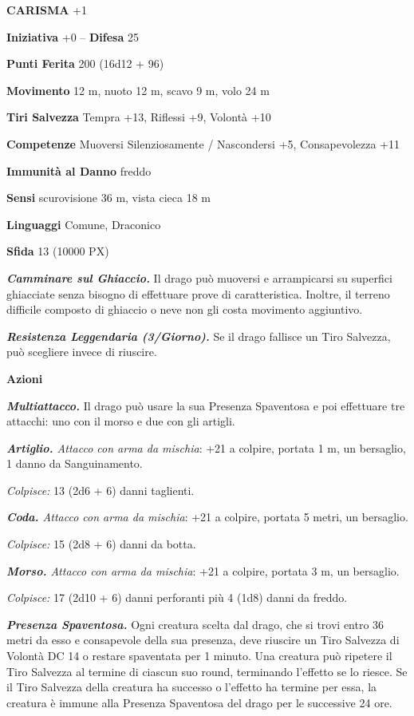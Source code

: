 \begin{multicols}{2}
	\textbf{CARISMA} +1

	\textbf{Iniziativa} +0 -- \textbf{Difesa} 25

	\textbf{Punti Ferita} 200 (16d12 + 96)

	\textbf{Movimento} 12 m, nuoto 12 m, scavo 9 m, volo 24 m

	\textbf{Tiri Salvezza} Tempra +13, Riflessi +9, Volontà +10

	\textbf{Competenze} Muoversi Silenziosamente / Nascondersi +5, Consapevolezza +11

	\textbf{Immunità al Danno} freddo

	\textbf{Sensi} scurovisione 36 m, vista cieca 18 m

	\textbf{Linguaggi} Comune, Draconico

	\textbf{Sfida} 13 (10000 PX)

	\textit{\textbf{Camminare sul Ghiaccio.}} Il drago può muoversi e arrampicarsi su superfici ghiacciate senza bisogno di effettuare prove di caratteristica. Inoltre, il terreno difficile composto di ghiaccio o neve non gli costa movimento aggiuntivo.

	\textit{\textbf{Resistenza Leggendaria (3/Giorno).}} Se il drago fallisce un Tiro Salvezza, può scegliere invece di riuscire.

	\textbf{Azioni}

	\textit{\textbf{Multiattacco.}} Il drago può usare la sua Presenza Spaventosa e poi effettuare tre attacchi: uno con il morso e due con gli artigli.

	\textit{\textbf{Artiglio.} Attacco con arma da mischia}: +21 a colpire, portata 1 m, un bersaglio, 1 danno da Sanguinamento.

	\textit{Colpisce:} 13 (2d6 + 6) danni taglienti.

	\textit{\textbf{Coda.} Attacco con arma da mischia}: +21 a colpire, portata 5 metri, un bersaglio.

	\textit{Colpisce:} 15 (2d8 + 6) danni da botta.

	\textit{\textbf{Morso.} Attacco con arma da mischia}: +21 a colpire, portata 3 m, un bersaglio.

	\textit{Colpisce:} 17 (2d10 + 6) danni perforanti più 4 (1d8) danni da freddo.

	\textit{\textbf{Presenza Spaventosa.}} Ogni creatura scelta dal drago, che si trovi entro 36 metri da esso e consapevole della sua presenza, deve riuscire un Tiro Salvezza di Volontà DC 14 o restare spaventata per 1 minuto. Una creatura può ripetere il Tiro Salvezza al termine di ciascun suo round, terminando l'effetto se lo riesce. Se il Tiro Salvezza della creatura ha successo o l'effetto ha termine per essa, la creatura è immune alla Presenza Spaventosa del drago per le successive 24 ore.


\end{multicols}
